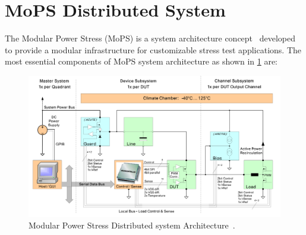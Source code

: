 \section{MoPS Distributed System}
The Modular Power Stress (MoPS) is a system architecture concept~\cite{Steinwender2013,Steinwender2016} developed to provide a modular infrastructure for customizable stress test applications.
The most essential components of \acrshort{MoPS} system architecture as shown in \cref{fig:MoPS} are: 
\begin{figure}
		\centering
		\includegraphics[trim=0 0 0 0, clip, width=\textwidth]{images/MoPS.PNG}
		\caption{Modular Power Stress Distributed system Architecture~\cite{Steinwender2013}.}
		\label{fig:MoPS}
\end{figure}

